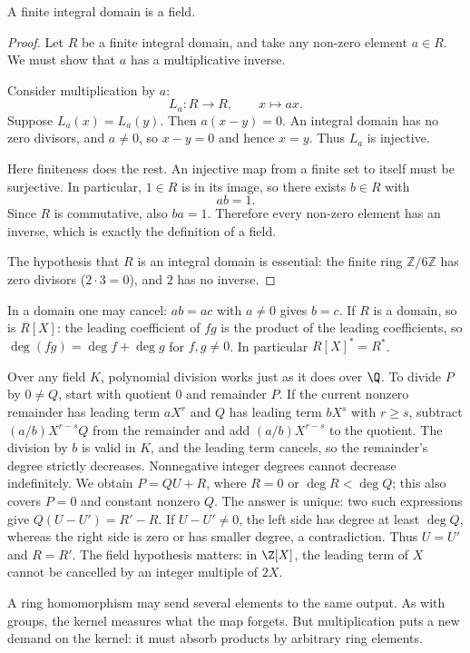 \begin{proposition}\label{prop:finitedomain}
A finite integral domain is a field.
\end{proposition}
\begin{proof}
Let $R$ be a finite integral domain, and
take any non-zero element $a\in R$.
We must show that $a$ has a multiplicative inverse.

Consider multiplication by $a$:
\[
L_a:R\longrightarrow R,\qquad x\longmapsto ax.
\]
Suppose $L_a(x)=L_a(y)$. Then
$a(x-y)=0$. An integral domain has no
zero divisors, and $a\ne0$, so $x-y=0$
and hence $x=y$. Thus $L_a$ is injective.

Here finiteness does the rest. An injective
map from a finite set to itself must be
surjective. In particular, $1\in R$
is in its image, so there exists $b\in R$
with
\[
ab=1.
\]
Since $R$ is commutative, also $ba=1$.
Therefore every non-zero element has an
inverse, which is exactly the definition
of a field.

The hypothesis that $R$ is an integral
domain is essential: the finite ring
$\mathbb Z/6\mathbb Z$ has zero divisors
($2\cdot3=0$), and $2$ has no inverse.
\end{proof}

In a domain one may cancel: $ab=ac$ with $a\ne0$ gives $b=c$. If $R$ is a domain, so is $R[X]$: the leading coefficient of $fg$ is the product of the leading coefficients, so $\deg(fg)=\deg f+\deg g$ for $f,g\ne0$. In particular $R[X]^*=R^*$.

Over any field $K$, polynomial division works just as it does over
$\Q$. To divide $P$ by $0\ne Q$, start with quotient $0$ and
remainder $P$. If the current nonzero remainder has leading term
$aX^r$ and $Q$ has leading term $bX^s$ with $r\ge s$, subtract
$(a/b)X^{r-s}Q$ from the remainder and add $(a/b)X^{r-s}$ to
the quotient. The division by $b$ is valid in $K$, and the leading
term cancels, so the remainder's degree strictly decreases. Nonnegative
integer degrees cannot decrease indefinitely. We obtain
$P=QU+R$, where $R=0$ or $\deg R<\deg Q$; this also covers
$P=0$ and constant nonzero $Q$. The answer is unique: two such
expressions give $Q(U-U')=R'-R$. If $U-U'\ne0$, the left
side has degree at least $\deg Q$, whereas the right side is zero
or has smaller degree, a contradiction. Thus $U=U'$ and $R=R'$.
The field hypothesis matters: in $\Z[X]$, the leading term of $X$
cannot be cancelled by an integer multiple of $2X$.

A ring homomorphism may send several elements to the same output. As with groups, the kernel measures what the map forgets. But multiplication puts a new demand on the kernel: it must absorb products by arbitrary ring elements.

